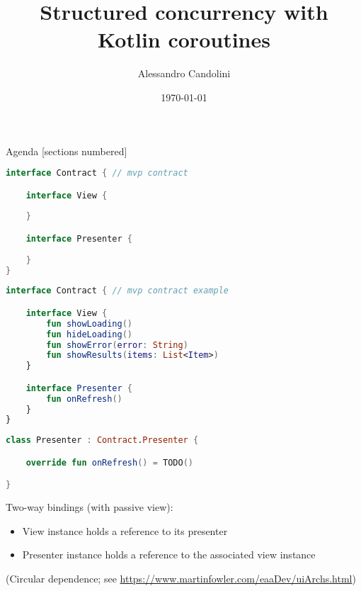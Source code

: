 \documentclass[10pt]{beamer}
\title{Structured concurrency with Kotlin coroutines}
\date{\today}
\author[A. Candolini]{Alessandro Candolini}
\begin{document}
\maketitle

\begin{frame}{Agenda}
  [sections numbered]
  \tableofcontents[hideallsubsections]
\end{frame}

\begin{frame}[fragile]
\begin{lstlisting}[language=Kotlin, basicstyle=\ttfamily]
interface Contract { // mvp contract

    interface View {
    
    }

    interface Presenter {
   
    }
}
\end{lstlisting}
\end{frame}

\begin{frame}[fragile]
\begin{lstlisting}[language=Kotlin, basicstyle=\ttfamily]
interface Contract { // mvp contract example

    interface View {
        fun showLoading()
        fun hideLoading()
        fun showError(error: String)
        fun showResults(items: List<Item>)
    }

    interface Presenter {
        fun onRefresh()
    }
}
\end{lstlisting}
\end{frame}
\begin{frame}[fragile]
\begin{lstlisting}[language=Kotlin, basicstyle=\ttfamily]
class Presenter : Contract.Presenter {

    override fun onRefresh() = TODO()

}
\end{lstlisting}
\end{frame}
\begin{frame}[fragile]
Two-way bindings (with passive view):
\begin{itemize}
\item View instance holds a reference to its presenter
\item Presenter instance holds a reference to the associated view  instance 
\end{itemize}

(Circular dependence; see 
\url{https://www.martinfowler.com/eaaDev/uiArchs.html})
\end{frame}
\end{document}
